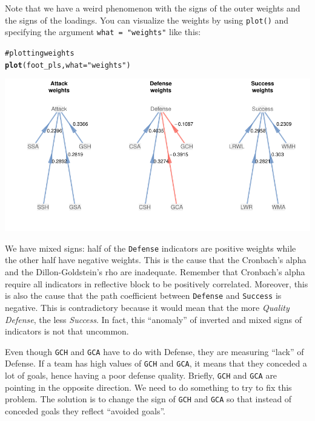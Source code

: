\documentclass[12pt]{book}\usepackage{graphicx, color}
\makeatletter
\newcommand{\hlfunctioncall}[1]{\textcolor[rgb]{0.501960784313725,0,0.329411764705882}{\textbf{#1}}}%
\newcommand{\hlstring}[1]{\textcolor[rgb]{0.6,0.6,1}{#1}}%
\newcommand{\hlcomment}[1]{\textcolor[rgb]{0.180392156862745,0.6,0.341176470588235}{#1}}%
\newenvironment{kframe}{%
 \def\at@end@of@kframe{}%
 \ifinner\ifhmode%
  \def\at@end@of@kframe{\end{minipage}}%
  \begin{minipage}{\columnwidth}%
 \fi\fi%
 \def\FrameCommand##1{\hskip\@totalleftmargin \hskip-\fboxsep
 \colorbox{shadecolor}{##1}\hskip-\fboxsep
     \hskip-\linewidth \hskip-\@totalleftmargin \hskip\columnwidth}%
 \MakeFramed {\advance\hsize-\width
   \@totalleftmargin\z@ \linewidth\hsize
   \@setminipage}}%
 {\par\unskip\endMakeFramed%
 \at@end@of@kframe}
\newenvironment{knitrout}{}{} %
\newcommand{\code}[1]{\texttt{#1}}
\makeatother
\begin{document}
Note that we have a weird phenomenon with the signs of the outer weights and the signs of the loadings. You can visualize the weights by using \code{plot()} and specifying the argument \code{what = "weights"} like this:
\begin{knitrout}
\color{fgcolor}\begin{kframe}
\begin{alltt}
\hlcomment{# plotting weights}
\hlfunctioncall{plot}(foot_pls, what = \hlstring{"weights"})
\end{alltt}
\end{kframe}

{\centering \includegraphics[width=1\linewidth,height=.5\linewidth]{figure/plot_weights} 

}



\end{knitrout}

We have mixed signs: half of the \code{Defense} indicators are positive weights while the other half have negative weights. This is the cause that the Cronbach's alpha and the Dillon-Goldstein's rho are inadequate. Remember that Cronbach's alpha require all indicators in reflective block to be positively correlated. Moreover, this is also the cause that the path coefficient between \code{Defense} and \code{Success} is negative. This is contradictory because it would mean that the more \textit{Quality Defense}, the less \textit{Success}. In fact, this ``anomaly'' of inverted and mixed signs of indicators is not that uncommon. 

Even though \code{GCH} and \code{GCA} have to do with Defense, they are measuring ``lack'' of Defense. If a team has high values of \code{GCH} and \code{GCA}, it means that they conceded a lot of goals, hence having a poor defense quality. Briefly, \code{GCH} and \code{GCA} are pointing in the opposite direction.  We need to do something to try to fix this problem. The solution is to change the sign of \code{GCH} and \code{GCA} so that instead of conceded goals they reflect ``avoided goals''. 
\end{document}
